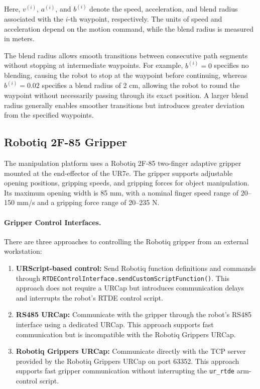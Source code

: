 \documentclass[11pt,a4paper]{article}
\begin{document}
Here, $v^{(i)}$, $a^{(i)}$, and $b^{(i)}$ denote the speed, acceleration, and blend radius associated with the $i$-th waypoint, respectively. The units of speed and acceleration depend on the motion command, while the blend radius is measured in meters.

The blend radius allows smooth transitions between consecutive path segments without stopping at intermediate waypoints. For example, $b^{(i)}=0$ specifies no blending, causing the robot to stop at the waypoint before continuing, whereas $b^{(i)}=0.02$ specifies a blend radius of 2 cm, allowing the robot to round the waypoint without necessarily passing through its exact position. A larger blend radius generally enables smoother transitions but introduces greater deviation from the specified waypoints.



\subsection{Robotiq 2F-85 Gripper}
\label{sec:robotiq_gripper}

The manipulation platform uses a Robotiq 2F-85 two-finger adaptive gripper mounted at the end-effector of the UR7e. The gripper supports adjustable opening positions, gripping speeds, and gripping forces for object manipulation. Its maximum opening width is 85 mm, with a nominal finger speed range of 20--150 mm/s and a gripping force range of 20--235 N.

\paragraph{Gripper Control Interfaces.}
There are three approaches to controlling the Robotiq gripper from an external workstation:
\begin{enumerate}
    \item \textbf{URScript-based control:} Send Robotiq function definitions and commands through \texttt{RTDEControlInterface.sendCustomScriptFunction()}. This approach does not require a URCap but introduces communication delays and interrupts the robot's RTDE control script.
    \item \textbf{RS485 URCap:} Communicate with the gripper through the robot's RS485 interface using a dedicated URCap. This approach supports fast communication but is incompatible with the Robotiq Grippers URCap.
    \item \textbf{Robotiq Grippers URCap:} Communicate directly with the TCP server provided by the Robotiq Grippers URCap on port 63352. This approach supports fast gripper communication without interrupting the \texttt{ur\_rtde} arm-control script.
\end{enumerate}
\end{document}
